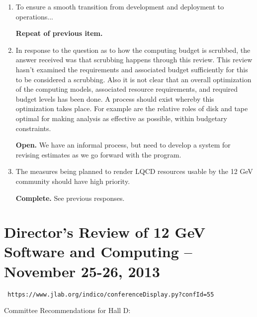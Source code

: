 \documentclass[12pt]{article}
\begin{document}
\begin{enumerate}
  {\bf Complete.} See previous responses.

\item To ensure a smooth transition from development and deployment to
  operations...

  {\bf Repeat of previous item.}

\item In response to the question as to how the computing budget is
  scrubbed, the answer received was that scrubbing happens through
  this review. This review hasn't examined the requirements and
  associated budget sufficiently for this to be considered a
  scrubbing. Also it is not clear that an overall optimization of the
  computing models, associated resource requirements, and required
  budget levels has been done. A process should exist whereby this
  optimization takes place. For example are the relative roles of disk
  and tape optimal for making analysis as effective as possible,
  within budgetary constraints.

  {\bf Open.} We have an informal process, but need to develop a system for revising estimates as we go forward with the program.

\item The measures being planned to render LQCD resources usable by
  the 12 GeV community should have high priority.

  {\bf Complete.} See previous responses.

\end{enumerate}

\section{Director's Review of 12 GeV Software and Computing -- November 25-26, 2013}

\begin{center}\tt
https://www.jlab.org/indico/conferenceDisplay.py?confId=55
\end{center}

Committee Recommendations for Hall D:
\end{document}

